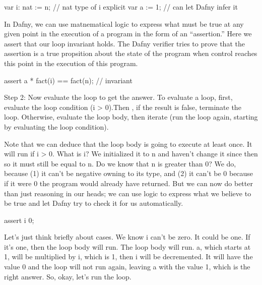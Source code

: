 \documentclass[letterpaper,10pt,english]{sphinxmanual}
\begin{document}
\begin{sphinxVerbatim}[commandchars=\\\{\}]
var i: nat := n;    // nat type of i explicit
var a := 1;         // can let Dafny infer it
\end{sphinxVerbatim}

In Dafny, we can use matnematical logic to express what must be true
at any given point in the execution of a program in the form of an
“assertion.” Here we assert that our loop invariant holds. The Dafny
verifier tries to prove that the assertion is a true propsition about
the state of the program when control reaches this point in the
execution of this program.

\begin{sphinxVerbatim}[commandchars=\\\{\}]
assert a * fact(i) == fact(n); // \PYGZdq{}invariant\PYGZdq{}
\end{sphinxVerbatim}

Step 2: Now evaluate the loop to get the answer. To evaluate a loop,
first, evaluate the loop condition (i \textgreater{} 0).Then , if the result is
false, terminate the loop. Otherwise, evaluate the loop body, then
iterate (run the loop again, starting by evaluating the loop
condition).

Note that we can deduce that the loop body is going to execute at
least once. It will run if i \textgreater{} 0. What is i? We initialized it to n
and haven’t change it since then so it must still be equal to n. Do we
know that n is greater than 0? We do, because (1) it can’t be negative
owning to its type, and (2) it can’t be 0 because if it were 0 the
program would already have returned. But we can now do better than
just reasoning in our heads; we can use logic to express what we
believe to be true and let Dafny try to check it for us automatically.

\begin{sphinxVerbatim}[commandchars=\\\{\}]
assert i \PYGZgt{} 0;
\end{sphinxVerbatim}

Let’s just think briefly about cases. We know i can’t be zero. It
could be one. If it’s one, then the loop body will run. The loop body
will run. a, which starts at 1, will be multiplied by i, which is 1,
then i will be decremented.  It will have the value 0 and the loop
will not run again, leaving a with the value 1, which is the right
answer. So, okay, let’s run the loop.
\end{document}

